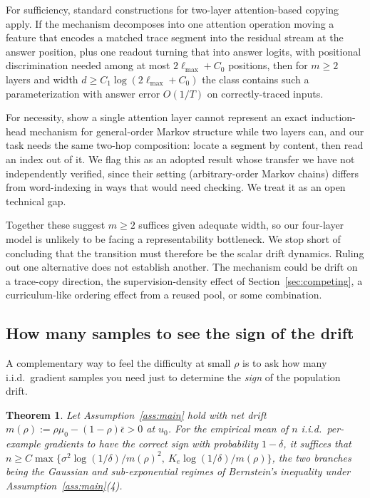 \documentclass{article}
\theoremstyle{plain}
\newtheorem{theorem}{Theorem}
\theoremstyle{definition}
\theoremstyle{remark}
\newcommand{\1}{\mathbf{1}}
\begin{document}
For sufficiency, standard constructions for two-layer attention-based copying
\citep{olsson2022incontext,ekbote2025what} apply. If the mechanism decomposes
into one attention operation moving a feature that encodes a matched trace
segment into the residual stream at the answer position, plus one readout turning
that into answer logits, with positional discrimination needed among at most
$2\ell_{\max}+C_0$ positions, then for $m\ge2$ layers and width
$d\ge C_1\log(2\ell_{\max}+C_0)$ the class contains such a parameterization with
answer error $O(1/T)$ on correctly-traced inputs.

For necessity, \citet{ekbote2025what} show a single attention layer cannot
represent an exact induction-head mechanism for general-order Markov structure
while two layers can, and our task needs the same two-hop composition: locate a
segment by content, then read an index out of it. We flag this as an adopted
result whose transfer we have not independently verified, since their setting
(arbitrary-order Markov chains) differs from word-indexing in ways that would
need checking. We treat it as an open technical gap.

Together these suggest $m\ge2$ suffices given adequate width, so our four-layer
model is unlikely to be facing a representability bottleneck. We stop short of
concluding that the transition must therefore be the scalar drift dynamics.
Ruling out one alternative does not establish another. The mechanism could be
drift on a trace-copy direction, the supervision-density effect of
Section~\ref{sec:competing}, a curriculum-like ordering effect from a reused
pool, or some combination.

\subsection{How many samples to see the sign of the drift}
\label{app:samplecomplexity}

A complementary way to feel the difficulty at small $\rho$ is to ask how many
i.i.d.\ gradient samples you need just to determine the \emph{sign} of the
population drift.

\begin{theorem}
\label{thm:samplecomplexity}
Let Assumption~\ref{ass:main} hold with net drift
$m(\rho) := \rho\mu_0-(1-\rho)\bar\epsilon>0$ at $u_0$. For the empirical mean of
$n$ i.i.d.\ per-example gradients to have the correct sign with probability
$1-\delta$, it suffices that
$n\ge C\max\{\sigma^2\log(1/\delta)/m(\rho)^2,\ K_e\log(1/\delta)/m(\rho)\}$, the
two branches being the Gaussian and sub-exponential regimes of Bernstein's
inequality under Assumption~\ref{ass:main}(4).
\end{theorem}
\end{document}
